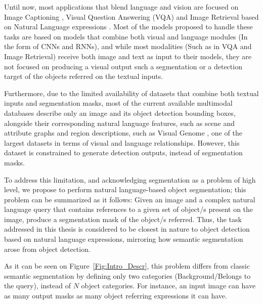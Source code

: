 Until now, most applications that blend language and vision are focused on Image Captioning \cite{DBLP:journals/corr/JohnsonKL15} \cite{DBLP:journals/corr/MaoHTCYM15} \cite{hendricks_deep_2015} \cite{gan_semantic_2016} \cite{johnson_densecap:_2016} \cite{yang_review_2016}, Visual Question Answering (VQA)  \cite{DBLP:journals/corr/ZhuGBF15} \cite{agrawal_vqa:_2015} \cite {goyal_making_2016} \cite{johnson_inferring_2017} \cite{teney_graph-structured_2016} and Image Retrieval based on Natural Language expressions \cite{hu_natural_2015} \cite{guadarrama_understanding_2016}. Most of the models proposed to handle these tasks are based on models that combine both visual and language modules (In the form of CNNs and RNNs), and while most modalities (Such as in VQA and Image Retrieval) receive both image and text as input to their models, they are not focused on producing a visual output such a segmentation or a detection target of the objects referred on the textual inputs.

Furthermore, due to the limited availability of datasets that combine both textual inputs and segmentation masks, most of the current available multimodal databases describe only an image and its object detection bounding boxes, alongside their corresponding natural language features, such as scene and attribute graphs and region descriptions, such as Visual Genome \cite{krishna_visual_2016}, one of the largest datasets in terms of visual and language relationships. However, this dataset is constrained to generate detection outputs, instead of segmentation masks.

To address this limitation, and acknowledging segmentation as a problem of high level, we propose to perform natural language-based object segmentation; this problem can be summarized as it follows: Given an image and a complex natural language query that contains references to a given set of object/s present on the image, produce a segmentation mask of the object/s referred. Thus, the task addressed in this thesis is considered to be closest in nature to object detection based on natural language expressions, mirroring how semantic segmentation arose from object detection.

As it can be seen on Figure~\ref{Fig:Intro_Descr}, this problem differs from classic semantic segmentation by defining only two categories (Background/Belongs to the query), instead of $N$ object categories. For instance, an input image can have as many output masks as many object referring expressions it can have.




